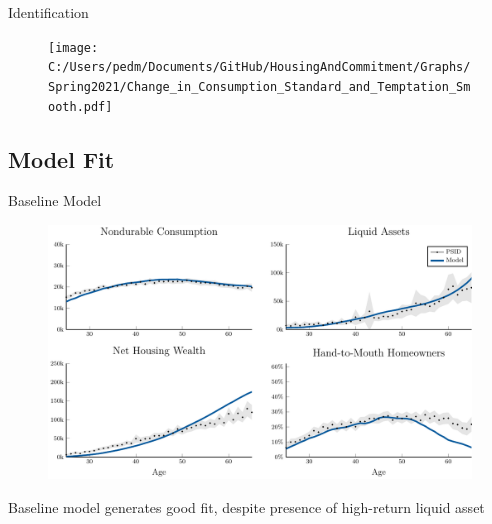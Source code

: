 \documentclass[10pt,english,t,10pt]{beamer}
\begin{document}
\begin{frame}{Identification}

\begin{figure}[ht]
	\centering
	\texttt{[image: C:/Users/pedm/Documents/GitHub/HousingAndCommitment/Graphs/Spring2021/Change\_in\_Consumption\_Standard\_and\_Temptation\_Smooth.pdf]}
\end{figure}




\end{frame}



\subsection{Model Fit}


\begin{frame} { Baseline Model}


\begin{figure}[ht]
\centering
\includegraphics[scale=0.45]{Prezentation_Graphs/TargetedMoments_Temptation}
\end{figure}

Baseline model generates good fit, despite presence of high-return liquid asset

\end{frame}
\end{document}
